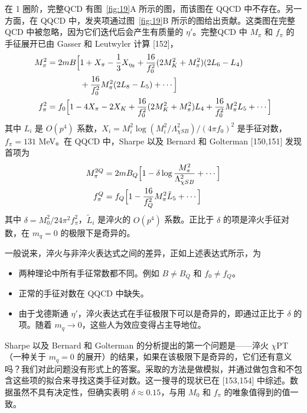 在 1 圈阶，完整QCD 有图~\ref{fig:19}A 所示的图，而该图在 QQCD 中不存在。另一方面，在 QQCD 中，发夹项通过图~\ref{fig:19}B 所示的图给出贡献。这类图在完整QCD 中被忽略，因为它们迭代后会产生有质量的 $\eta'$。完整QCD 中 $M_\pi$ 和 $f_\pi$ 的手征展开已由 Gasser 和 Leutwyler 计算 [152]，
\begin{equation}
\begin{aligned}
M_\pi^2 &= 2mB\Bigl[1 + X_\pi - \frac{1}{3} X_{\eta_8} + \frac{16}{f_0^2}(2M_K^2 + M_\pi^2)(2L_6 - L_4) \\
&\qquad\qquad + \frac{16}{f_0^2} M_\pi^2 (2L_8 - L_5) + \cdots\Bigr] \\
f_\pi^2 &= f_0\Bigl[1 - 4X_\pi - 2X_K + \frac{16}{f_0^2}(2M_K^2 + M_\pi^2)L_4 + \frac{16}{f_0^2} M_\pi^2 L_5 + \cdots\Bigr]
\end{aligned}
\end{equation}
其中 $L_i$ 是 $O(p^4)$ 系数，$X_i = M_i^2 \log(M_i^2/\Lambda_{\chi SB}^2)/(4\pi f_0)^2$ 是手征对数，$f_\pi = 131$ MeV。在 QQCD 中，Sharpe 以及 Bernard 和 Golterman [150,151] 发现首项为
\begin{equation}
\begin{aligned}
M_\pi^{2Q} &= 2mB_Q\Bigl[1 - \delta \log\frac{M_\pi^2}{\Lambda_{\chi SB}^2} + \cdots\Bigr] \\
f_\pi^Q &= f_Q\Bigl[1 - \frac{16}{f_Q^2} M_\pi^2 \tilde{L}_5 + \cdots\Bigr]
\end{aligned}
\end{equation}
其中 $\delta = M_0^2 / 24\pi^2 f_\pi^2$，$\tilde{L}_i$ 是淬火的 $O(p^4)$ 系数。正比于 $\delta$ 的项是淬火手征对数，在 $m_q = 0$ 的极限下是奇异的。

一般说来，淬火与非淬火表达式之间的差异，正如上述表达式所示，为
\begin{itemize}
\item 两种理论中所有手征常数都不同。例如 $B \neq B_Q$ 和 $f_0 \neq f_Q$。
\item 正常的手征对数在 QQCD 中缺失。
\item 由于戈德斯通 $\eta'$，淬火表达式在手征极限下可以是奇异的，即通过正比于 $\delta$ 的项。随着 $m_q \to 0$，这些人为效应变得占主导地位。
\end{itemize}

Sharpe 以及 Bernard 和 Golterman 的分析提出的第一个问题是——淬火 $\chi$PT（一种关于 $m_q = 0$ 的展开）的结果，如果在该极限下是奇异的，它们还有意义吗？我们对此问题没有形式上的答案。采取的方法是做模拟，并通过做包含和不包含这些项的拟合来寻找这类手征对数。这一搜寻的现状已在 [153,154] 中综述。数据虽然不具有决定性，但确实表明 $\delta \approx 0.15$，与用 $M_0$ 和 $f_\pi$ 的唯象值得到的值一致。

